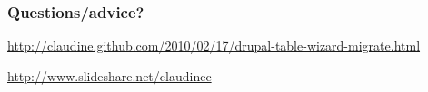 \documentclass[ignorenonframetext,11pt]{beamer}
\def\mybibliostyle{plain}
\def\bibliocommand{}
\begin{document}
\begin{frame}
\frametitle{Questions/advice?}
\label{questionsadvice}

\url{http://claudine.github.com/2010/02/17/drupal-table-wizard-migrate.html}


\url{http://www.slideshare.net/claudinec}



\end{frame}
		



%
\end{document}
